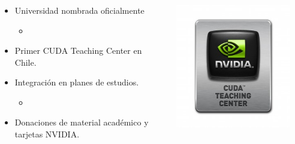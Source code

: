 \frame
{
\frametitle{}
\begin{columns}
    \begin{column}{0.65\textwidth}
        \begin{itemize}
            \item Universidad nombrada oficialmente
            \begin{itemize}
                \item {}
            \end{itemize}
            \item Primer CUDA Teaching Center en Chile.
            \item Integración en planes de estudios.
            \begin{itemize}
                \item {}
            \end{itemize}
            \item Donaciones de material académico y tarjetas NVIDIA.
        \end{itemize}
    \end{column}
    \begin{column}{0.35\textwidth}
        \begin{center}
            \includegraphics[width=0.9\textwidth]{img/cuda_teaching}
        \end{center}
    \end{column}
\end{columns}
}
